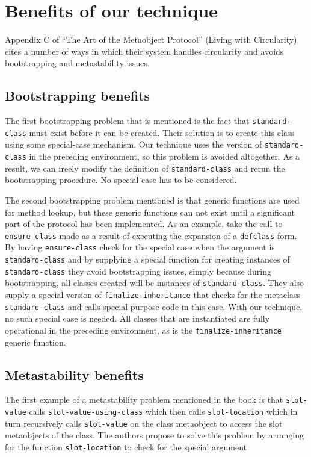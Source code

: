 \section{Benefits of our technique}
\label{sec-benefits}

Appendix C of ``The Art of the Metaobject Protocol''
\cite{Kiczales:1991:AMP:574212} (Living with Circularity) cites a
number of ways in which their system handles circularity and avoids
bootstrapping and metastability issues.

\subsection{Bootstrapping benefits}

The first bootstrapping problem that is mentioned is the fact that
\texttt{standard-class} must exist before it can be created.  Their
solution is to create this class using some special-case mechanism.
Our technique uses the version of \texttt{standard-class} in the
preceding environment, so this problem is avoided altogether.  As a
result, we can freely modify the definition of
\texttt{standard-class} and rerun the bootstrapping procedure.  No
special case has to be considered.

The second bootstrapping problem mentioned is that generic functions
are used for method lookup, but these generic functions can not exist
until a significant part of the protocol has been implemented.  As an
example, take the call to \texttt{ensure-class} made as a result of
executing the expansion of a \texttt{defclass} form.  By having
\texttt{ensure-class} check for the special case when the argument is
\texttt{standard-class} and by supplying a special function for
creating instances of \texttt{standard-class} they avoid bootstrapping
issues, simply because during bootstrapping, all classes created will
be instances of \texttt{standard-class}.  They also supply a special
version of \texttt{finalize-inheritance} that checks for the metaclass
\texttt{standard-class} and calls special-purpose code in this case.
With our technique, no such special case is needed.  All
classes that are instantiated are fully operational in the preceding
environment, as is the \texttt{finalize-inheritance} generic function.

\subsection{Metastability benefits}

The first example of a metastability problem mentioned in the book is
that \texttt{slot-value} calls \texttt{slot-value-using-class} which
then calls \texttt{slot-location} which in turn recursively calls
\texttt{slot-value} on the class metaobject to access the slot
metaobjects of the class.  The authors propose to solve this problem
by arranging for the function \texttt{slot-location} to check for the
special argument

